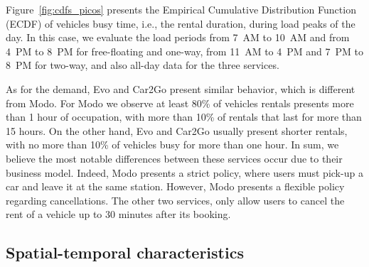 Figure~\ref{fig:cdfs_picos} presents the Empirical Cumulative Distribution Function (ECDF) of vehicles busy time, i.e., the rental duration, during load peaks of the day. In this case, we evaluate the load periods from 7~AM to 10~AM and from 4~PM to 8~PM for free-floating and one-way, from 11~AM to 4~PM and 7~PM to 8~PM for two-way, and also all-day data for the three services. 

As for the demand, Evo and Car2Go present similar behavior, which is different from Modo. For Modo we observe at least 80\% of vehicles rentals presents more than 1 hour of occupation, with more than 10\% of rentals that last for more than 15 hours. On the other hand, Evo and Car2Go usually present shorter rentals, with no more than 10\% of vehicles busy for more than one hour. 
In sum, we believe the most notable differences between these services occur due to their business model. Indeed, Modo presents a strict policy, where users must pick-up a car and leave it at the same station. However, Modo presents a flexible policy regarding cancellations. The other two services, only allow users to cancel the rent of a vehicle up to 30 minutes after its booking.


\subsection{Spatial-temporal characteristics}
\label{sec:spatial-temporal}


